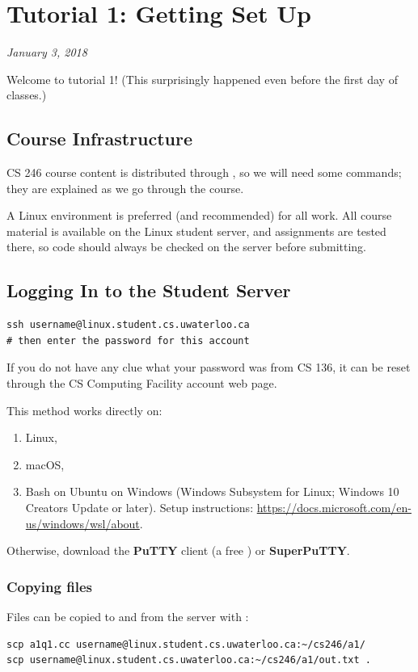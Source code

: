 \chapter{Tutorial 1: Getting Set Up}
\begin{center}
\textit{January 3, 2018}
\end{center}

Welcome to tutorial 1! (This surprisingly happened even before the first day of
classes.)

\section{Course Infrastructure}
CS 246 course content is distributed through , so we will need some
 commands; they are explained as we go through the course.

A Linux environment is preferred (and recommended) for all work. All course
material is available on the Linux student server, and assignments are tested
there, so code should always be checked on the server before submitting.

\section{Logging In to the Student Server}
\begin{lstlisting}[style=bash]
ssh username@linux.student.cs.uwaterloo.ca
# then enter the password for this account
\end{lstlisting}
If you do not have any clue what your  password was
from CS 136, it can be reset through the CS Computing Facility account web page.

This method works directly on:
\begin{enumerate}
  \item Linux,
  \item macOS,
  \item Bash on Ubuntu on Windows (Windows Subsystem for Linux; Windows 10
        Creators Update or later). Setup instructions:
        \url{https://docs.microsoft.com/en-us/windows/wsl/about}.
\end{enumerate}
Otherwise, download the \textbf{PuTTY} client (a free ) or
\textbf{SuperPuTTY}.

\subsection*{Copying files}
Files can be copied to and from the server with :
\begin{lstlisting}[style=bash]
scp a1q1.cc username@linux.student.cs.uwaterloo.ca:~/cs246/a1/
scp username@linux.student.cs.uwaterloo.ca:~/cs246/a1/out.txt .
\end{lstlisting}

